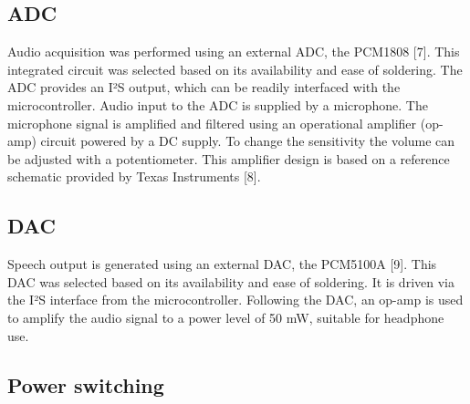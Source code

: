 \subsection{ADC}


Audio acquisition was performed using an external ADC, the PCM1808 [7].
This integrated circuit was selected based on its availability and ease of soldering.
 The ADC provides an I²S output, which can be readily interfaced with the microcontroller.
Audio input to the ADC is supplied by a microphone. 
The microphone signal is amplified and filtered using an operational amplifier (op-amp) circuit powered by a DC supply.
To change the sensitivity the volume can be adjusted with a potentiometer.
This amplifier design is based on a reference schematic provided by Texas Instruments [8]. 


\subsection{DAC}


Speech output is generated using an external DAC, the PCM5100A [9].
This DAC was selected based on its availability and ease of soldering. 
It is driven via the I²S interface from the microcontroller.
Following the DAC, an op-amp is used to amplify the audio signal to a power level of  50 mW, suitable for headphone use.

\subsection{Power switching}


